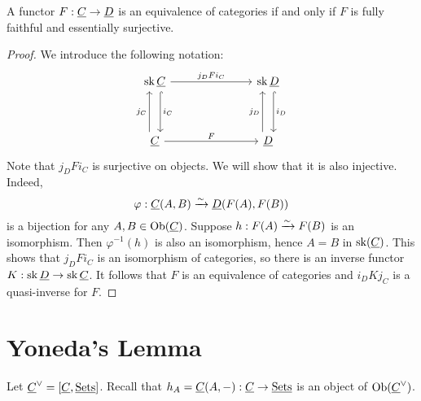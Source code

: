 
\begin{theorem*}
	A functor \( F: \underline{C} \to \underline{D} \) is an equivalence of categories if and only if \( F \) is fully faithful and essentially surjective.
\end{theorem*}
\begin{proof}
	We introduce the following notation:
	\[
		\begin{tikzcd}{\opn{sk} \C} &&& {\opn{sk} \ct{D}} \\
			\\
			\C &&& {\ct{D}}
			\arrow["{j_D F i_C}", from=1-1, to=1-4]
			\arrow["{i_C}", shift left=2, hook, from=1-1, to=3-1]
			\arrow["{i_D}", shift left=2, hook, from=1-4, to=3-4]
			\arrow["{j_C}", shift left=2, from=3-1, to=1-1]
			\arrow["F", from=3-1, to=3-4]
			\arrow["{j_D}", shift left=2, from=3-4, to=1-4]
		\end{tikzcd}
	\]
	Note that \( j_D F i_C \) is surjective on objects. We will show that it is also injective. Indeed,
	\[
		\varphi: \underline{C}(A, B) \xrightarrow{\sim} \underline{D}(F(A), F(B))
	\]
	is a bijection for any \( A, B \in \operatorname{Ob}(\underline{C}) \). Suppose \( h: F(A) \xrightarrow{\sim} F(B) \) is an isomorphism. Then \( \varphi^{-1}(h) \) is also an isomorphism, hence \( A = B \) in \( \operatorname{sk}(\underline{C}) \). This shows that \( j_D F i_C \) is an isomorphism of categories, so there is an inverse functor \( K: \operatorname{sk} \underline{D} \to \operatorname{sk} \underline{C} \). It follows that \( F \) is an equivalence of categories and \( i_D K j_C \) is a quasi-inverse for \( F \).
\end{proof}

\section{Yoneda's Lemma}

Let \( \underline{C}^\vee = [\underline{C}, \underline{\mathrm{Sets}}] \). Recall that \( h_A = \underline{C}(A, -): \underline{C} \to \underline{\mathrm{Sets}} \) is an object of \( \operatorname{Ob}(\underline{C}^\vee) \).

